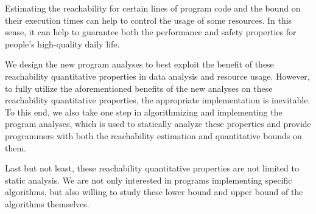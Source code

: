 Estimating the reachability for certain lines of program code and the bound on their execution times
can help to control the usage of some resources.
In this sense, it can help to guarantee both the performance and safety properties for
people's high-quality daily life.

    We design the new program
analyses
to best exploit the benefit of these reachability quantitative properties in data analysis and resource usage.
However, to fully utilize the aforementioned benefits of the new analyses on these reachability quantitative properties, 
the appropriate implementation is inevitable. 
To this end, we also take one step in algorithmizing and implementing the program analyses,
which is used to statically analyze these properties and provide programmers with both the reachability estimation
and quantitative bounds on them.

Last but not least, these reachability quantitative properties are not limited to static analysis.
We are not only interested in programs implementing
specific algorithms, but also willing to study these lower bound and upper bound of the algorithms themselves.

